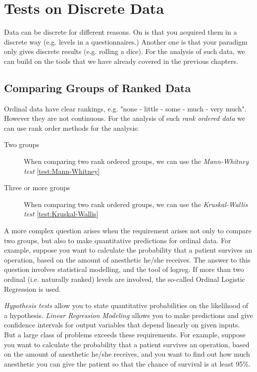 \chapter{Tests on Discrete Data}

Data can be discrete for different reasons. On is that you acquired them in a discrete way (e.g. levels in a questionnaires.) Another one is that your paradigm only gives discrete results (e.g. rolling a dice). For the analysis of such data, we can build on the tools that we have already covered in the previous chapters.

\section{Comparing Groups of Ranked Data}

Ordinal data have clear rankings, e.g. "none - little - some - much - very much". However they are not continuous. For the analysis of such \emph{rank ordered data} we can use rank order methods for the analysis:

\begin{description}
  \item[Two groups] When comparing two rank ordered groups, we can use the \emph{Mann-Whitney test} \ref{test:Mann-Whitney}
  \item[Three or more groups]  When comparing two rank ordered groups, we can use the \emph{Kruskal-Wallis test} \ref{test:Kruskal-Wallis}

\end{description}

A more complex question arises when the requirement arises not only to compare two groups, but also to make quantitative predictions for ordinal data. For example, suppose you want to calculate the probability that a patient survives an operation, based on the amount of anesthetic he/she receives. The answer to this question involves statistical modelling, and the tool of \gls{logreg}. If more than two ordinal (i.e. naturally ranked) levels are involved, the so-called Ordinal Logistic Regression is used.

\emph{Hypothesis tests} allow you to state quantitative probabilities on the likelihood of a hypothesis. \emph{Linear Regression Modeling} allows you to make predictions and give confidence intervals for output variables that depend linearly on given inputs. But a large class of problems exceeds these requirements. For example, suppose you want to calculate the probability that a patient survives an operation, based on the amount of anesthetic he/she receives, and you want to find out how much anesthetic you can give the patient so that the chance of survival is at least 95\%.

